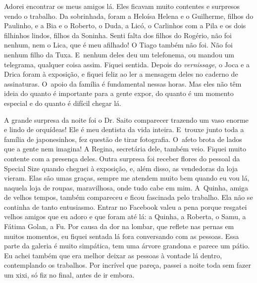Adorei encontrar os meus amigos lá. Eles ficavam muito contentes e
surpresos vendo o trabalho. Da sobrinhada, foram a Heloísa Helena e o
Guilherme, filhos do Paulinho, e a Bia e o Roberto, o Duda, a Licó, o
Carlinhos com a Pila e os dois filhinhos lindos, filhos da Soninha.
Senti falta dos filhos do Rogério, não foi nenhum, nem o Lica, que é meu
afilhado! O Tiago também não foi. Não foi nenhum filho da Tuxa. E~nenhum
deles deu um telefonema, ou mandou um telegrama, qualquer coisa assim.
Fiquei sentida. Depois do \emph{vernissage}, o Joca e a Drica foram à
exposição, e fiquei feliz ao ler a mensagem deles no caderno de
assinaturas. O~apoio da família é fundamental nessas horas. Mas eles não
têm ideia do quanto é importante para a gente expor, do quanto é um
momento especial e do quanto é difícil chegar lá.

A grande surpresa da noite foi o Dr. Saito comparecer trazendo um vaso
enorme e lindo de orquídeas! Ele é meu dentista da vida inteira. E~trouxe junto toda a família de japonesinhos, fez questão de tirar
fotografia. O~afeto brota de lados que a gente nem imagina! A Regina,
secretária dele, também veio. Fiquei muito contente com a presença
deles. Outra surpresa foi receber flores do pessoal da Special Size
quando cheguei à exposição, e, além disso, as vendedoras da loja vieram.
Elas são umas graças, sempre me atendem muito bem quando eu vou lá,
naquela loja de roupas, maravilhosa, onde tudo cabe em mim. A~Quinha,
amiga de velhos tempos, também compareceu e ficou fascinada pelo
trabalho. Ela não se continha de tanto entusiasmo. Entrar no Facebook
valeu a pena porque resgatei velhos amigos que eu adoro e que foram até
lá: a Quinha, a Roberta, o Samu, a Fátima Golan, a Fu. Por causa da dor
na lombar, que reflete nas pernas em muitos momentos, eu fiquei sentada
lá fora conversando com as pessoas. Essa parte da galeria é muito
simpática, tem uma árvore grandona e parece um pátio. Eu achei também
que era melhor deixar as pessoas à vontade lá dentro, contemplando os
trabalhos. Por incrível que pareça, passei a noite toda sem fazer um
xixi, só fiz no final, antes de ir embora.

